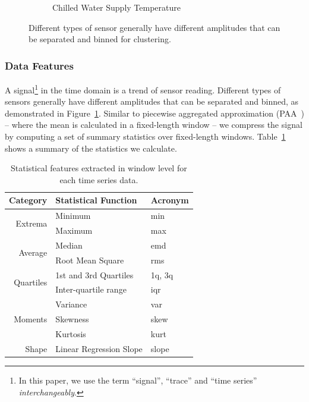 \begin{figure}[ht!]
\begin{subfigure}{0.32\textwidth}
                \caption{Chilled Water Supply Temperature}
  \end{subfigure}
\caption{Different types of sensor generally have different amplitudes that can be separated and binned for clustering.}
\label{fig:example}
\end{figure}

\subsubsection{Data Features}
A signal\footnote{In this paper, we use the term ``signal'', ``trace'' and ``time series'' \textit{interchangeably}.} in the time domain is a trend of sensor reading. 
Different types of sensors generally have different amplitudes that can be separated and binned,  
as demonstrated in Figure~\ref{fig:example}. 
Similar to piecewise aggregated approximation (PAA~\cite{paa}) -- where the mean is calculated in a fixed-length window -- 
we compress the signal by computing a set of summary statistics over fixed-length windows. 
Table~\ref{table:fd} shows a summary of the statistics we calculate.


\begin{table}[h]
\centering
\begin{tabular}{r|l|l}
\hline
Category                   & Statistical Function & \multicolumn{1}{l}{Acronym} \\ \hline\hline
\multirow{2}{*}{Extrema}   & Minimum                 & min                          \\ \cline{3-3} 
                           & Maximum                 & max                          \\ \hline
\multirow{2}{*}{Average}   & Median                  & emd                          \\ \cline{3-3} 
                           & Root Mean Square        & rms                          \\ \hline
\multirow{2}{*}{Quartiles} & 1st and 3rd Quartiles   & 1q, 3q                       \\ \cline{3-3} 
                           & Inter-quartile range    & iqr                          \\ \hline
\multirow{3}{*}{Moments}   & Variance                & var                          \\ \cline{3-3} 
                           & Skewness                & skew                         \\ \cline{3-3} 
                           & Kurtosis                & kurt                         \\ \hline
Shape                      & Linear Regression Slope & slope                        \\ \hline
\end{tabular}
\caption{Statistical features extracted in window level for each time series data.}
\label{table:fd}
\end{table}


